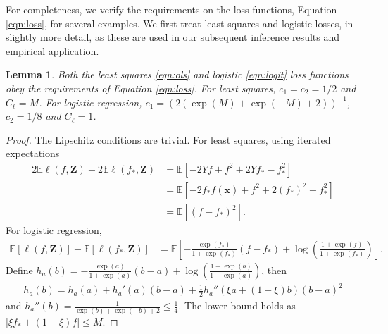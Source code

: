 \documentclass[11pt]{article}
\newtheorem{lemma}{Lemma}
\numberwithin{equation}{section}
\theoremstyle{definition}
\newcommand{\E}{\mathbb{E}}
\newcommand{\bZ}{\bm{Z}}
\newcommand{\bx}{\bm{x}}
\begin{document}
\begin{appendices}
For completeness, we verify the requirements on the loss functions, Equation \eqref{eqn:loss}, for several examples. We first treat least squares and logistic losses, in slightly more detail, as these are used in our subsequent inference results and empirical application.
\begin{lemma}
	\label{lem:ls and logit}
	Both the least squares \eqref{eqn:ols} and logistic \eqref{eqn:logit} loss functions obey the requirements of Equation \eqref{eqn:loss}. For least squares, $c_1 = c_2 = 1/2$ and $C_\ell = M$. For logistic regression, $c_1 = \left(2(\exp(M)+\exp(-M)+2)\right)^{-1}$, $c_2 = 1/8$ and $C_\ell=1$. 
\end{lemma}
\begin{proof}
	The Lipschitz conditions are trivial. For least squares, using iterated expectations
	\begin{align*}
		2 \E \ell(f, \bZ) - 2 \E \ell (f_*, \bZ) & =  \E \left[ - 2 Y f + f^2 + 2 Yf_* - f_*^2 \right]    \\
		& =  \E \left[ - 2 f_* f(\bx) + f^2 + 2 (f_*)^2 - f_*^2 \right]    \\
		&=  \E \left[ (f - f_*)^2\right].
	\end{align*}
	For logistic regression,
	\begin{align*}
		\E [\ell(f, \bZ)] - \E [\ell (f_*, \bZ)] &= \E \left[ - \frac{\exp(f_*)}{1+\exp(f_*)} (f - f_*) + \log \left( \frac{1+\exp(f)}{1+\exp(f_*)} \right) \right].
	\end{align*}
	Define $h_a(b) = - \frac{\exp(a)}{1+\exp(a)} (b-a) + \log \left( \frac{1+\exp(b)}{1+\exp(a)} \right)$, then 
	\begin{align*}
		h_a(b) = h_a(a) + h_a'(a)(b-a) + \frac{1}{2} h_a''\left(\xi a+ (1-\xi) b \right)  (b-a)^2
	\end{align*}
	and $h_a''(b) = \frac{1}{\exp(b)+\exp(-b)+2} \leq \frac{1}{4}$. The lower bound holds as $|\xi f_* + (1-\xi) f| \leq M$. 
\end{proof}



\end{appendices}
\end{document}
